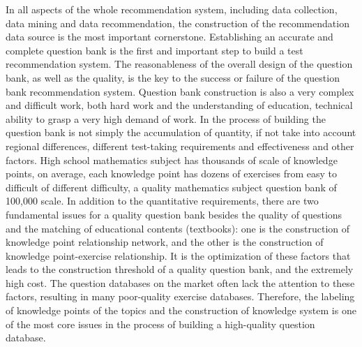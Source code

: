 In all aspects of the whole recommendation system, including data collection, data mining and data recommendation, the construction of the recommendation data source is the most important cornerstone. Establishing an accurate and complete question bank is the first and important step to build a test recommendation system. The reasonableness of the overall design of the question bank, as well as the quality, is the key to the success or failure of the question bank recommendation system. Question bank construction is also a very complex and difficult work, both hard work and the understanding of education, technical ability to grasp a very high demand of work. In the process of building the question bank is not simply the accumulation of quantity, if not take into account regional differences, different test-taking requirements and effectiveness and other factors. High school mathematics subject has thousands of scale of knowledge points, on average, each knowledge point has dozens of exercises from easy to difficult of different difficulty, a quality mathematics subject question bank of 100,000 scale. In addition to the quantitative requirements, there are two fundamental issues for a quality question bank besides the quality of questions and the matching of educational contents (textbooks): one is the construction of knowledge point relationship network, and the other is the construction of knowledge point-exercise relationship. It is the optimization of these factors that leads to the construction threshold of a quality question bank, and the extremely high cost. The question databases on the market often lack the attention to these factors, resulting in many poor-quality exercise databases. Therefore, the labeling of knowledge points of the topics and the construction of knowledge system is one of the most core issues in the process of building a high-quality question database.


